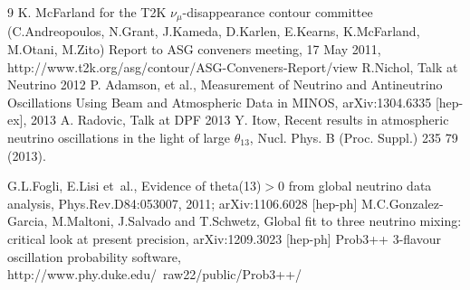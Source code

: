 \begin{thebibliography}{9}
%
%
  K. McFarland for the T2K $\nu_{\mu}$-disappearance contour committee 
  (C.Andreopoulos, N.Grant, J.Kameda, D.Karlen, E.Kearns, K.McFarland, M.Otani, M.Zito)
  Report to ASG conveners meeting, 17 May 2011,
  http://www.t2k.org/asg/contour/ASG-Conveners-Report/view
%
%
  R.Nichol,
  Talk at Neutrino 2012
  P. Adamson, et al.,
  Measurement of Neutrino and Antineutrino Oscillations Using Beam and Atmospheric Data in MINOS,
  arXiv:1304.6335 [hep-ex], 2013
  A. Radovic,
  Talk at DPF 2013
  Y. Itow,
  Recent results in atmospheric neutrino oscillations in the light of large $\theta_{13}$,
  Nucl. Phys. B (Proc. Suppl.) 235 79 (2013).

% 
%
%
%
  G.L.Fogli, E.Lisi et~al.,
  Evidence of theta(13)$>$0 from global neutrino data analysis,
  Phys.Rev.D84:053007, 2011; arXiv:1106.6028 [hep-ph]
 M.C.Gonzalez-Garcia, M.Maltoni, J.Salvado and T.Schwetz,
 Global fit to three neutrino mixing: critical look at present precision,
 arXiv:1209.3023 [hep-ph]
%
%
%
%
 Prob3++ 3-flavour oscillation probability software,
 http://www.phy.duke.edu/~raw22/public/Prob3++/

\end{thebibliography}


